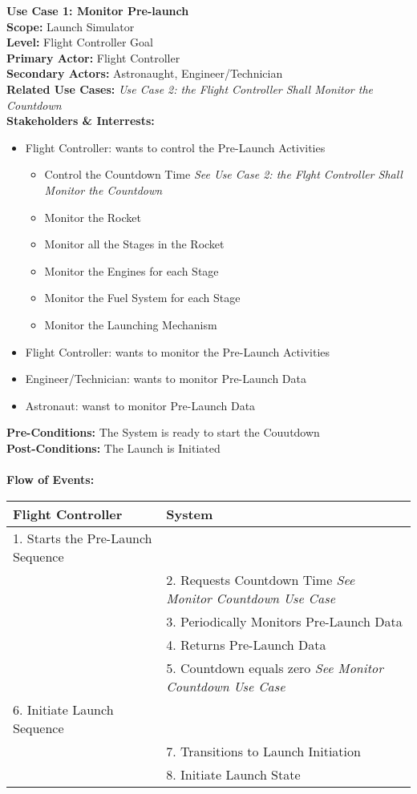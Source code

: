 \documentclass[letterpaper]{article}
\begin{document}
\noindent
\textbf{Use Case 1:  Monitor Pre-launch}\\
\textbf{Scope:  }Launch Simulator\\
\textbf{Level:  }Flight Controller Goal\\
\textbf{Primary Actor:  }Flight Controller\\
\textbf{Secondary Actors:  }Astronaught, Engineer/Technician\\
\textbf{Related Use Cases:  }\textit{Use Case 2:  the Flight
Controller Shall Monitor the Countdown}\\
\textbf{Stakeholders \& Interrests:  }
\begin{itemize}
\item Flight Controller: wants to control the Pre-Launch Activities
\begin{itemize}
\item Control the Countdown Time \textit{See Use Case 2:  the Flght
Controller Shall Monitor the Countdown}
\item Monitor the Rocket
\item Monitor all the Stages in the Rocket
\item Monitor the Engines for each Stage
\item Monitor the Fuel System for each Stage
\item Monitor the Launching Mechanism
\end{itemize}
\item Flight Controller: wants to monitor the Pre-Launch Activities
\item Engineer/Technician:  wants to monitor Pre-Launch Data
\item Astronaut:  wanst to monitor Pre-Launch Data
\end{itemize}
\textbf{Pre-Conditions:  }The System is ready to start the
Couutdown\\
\textbf{Post-Conditions:  }The Launch is Initiated\\\\
\textbf{Flow of Events:}\\
\begin{tabular}{|p{5.75cm}|p{5.75cm}|}\hline
\textbf{Flight Controller}&\textbf{System}\\\hline
1. Starts the Pre-Launch Sequence & \\\hline
& 2.  Requests Countdown Time \textit{See Monitor Countdown Use
Case}\\\hline
& 3. Periodically Monitors Pre-Launch Data\\\hline
& 4. Returns Pre-Launch Data\\\hline
& 5. Countdown equals zero \textit{See Monitor Countdown Use
Case}\\\hline
6. Initiate Launch Sequence & \\\hline
& 7.  Transitions to Launch Initiation\\\hline
& 8.  Initiate Launch State\\\hline
\end{tabular}\\\\
\end{document}
